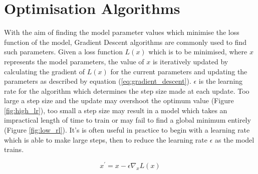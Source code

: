 \section{Optimisation Algorithms}
With the aim of finding the model parameter values which minimise the loss function of the model, Gradient Descent algorithms are commonly used to find such parameters.
Given a loss function $L(x)$ which is to be minimised, where $x$ represents the model parameters, the value of $x$ is iteratively updated by calculating the gradient of $L(x)$ for the current parameters and updating the parameters as described by equation (\ref{eq:gradient_descent}).
$\epsilon$ is the learning rate for the algorithm which determines the step size made at each update.
Too large a step size and the update may overshoot the optimum value (Figure \ref{fig:high_lr}), too small a step size may result in a model which takes an impractical length of time to train or may fail to find a global minimum entirely (Figure \ref{fig:low_rl}). 
It's is often useful in practice to begin with a learning rate which is able to make large steps, then to reduce the learning rate $\epsilon$ as the model trains.

\begin{equation}\label{eq:gradient_descent}
   x^\prime = x - \epsilon \nabla_x L(x)
\end{equation}

